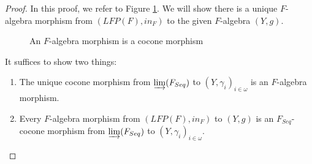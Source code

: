 \documentclass{msthesis}
\theoremstyle{definition}
\newcommand{\colim}{\varinjlim}
\begin{document}
\begin{proof}
    In this proof, we refer to Figure \ref{fig:falgcoconemorphism}.  We will show there is a unique $F$-algebra morphism from $(LFP(F), in_F)$ to the given $F$-algebra $(Y, g)$.

    \begin{figure}[htbp]
    \centering
{    
    \caption{An $F$-algebra morphism is a cocone morphism}
    \label{fig:falgcoconemorphism}
}
\end{figure}

    It suffices to show two things:
    \begin{enumerate}[label=(\arabic*),nosep]
        \item The unique cocone morphism from $\colim(F_{Seq})$ to $(Y, \gamma_i)_{i \in \omega}$ is an $F$-algebra morphism.
        \item Every $F$-algebra morphism from $(LFP(F), in_F)$ to $(Y, g)$ is an $F_{Seq}$-cocone morphism from $\colim(F_{Seq})$ to $(Y, \gamma_i)_{i \in \omega}$.
    \end{enumerate}


\end{proof}
\end{document}
